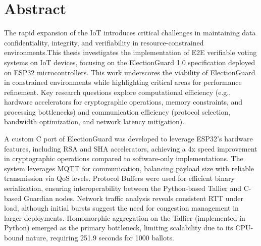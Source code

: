 \chapter*{Abstract}
The rapid expansion of the \ac{IoT} introduces critical challenges in maintaining data confidentiality, integrity, and verifiability in resource-constrained environments.This thesis investigates the implementation of \ac{E2E} verifiable voting systems on IoT devices, focusing on the ElectionGuard 1.0 specification deployed on ESP32 microcontrollers. This work underscores the viability of ElectionGuard in constrained environments while highlighting critical areas for performance refinement. Key research questions explore computational efficiency (e.g., hardware accelerators for cryptographic operations, memory constraints, and processing bottlenecks) and communication efficiency (protocol selection, bandwidth optimization, and network latency mitigation).

A custom C port of ElectionGuard was developed to leverage ESP32's hardware features, including \ac{RSA} and \ac{SHA} accelerators, achieving a 4x speed improvement in cryptographic operations compared to software-only implementations. The system leverages \ac{MQTT} for communication, balancing payload size with reliable transmission via QoS levels. Protocol Buffers were used for efficient binary serialization, ensuring interoperability between the Python-based Tallier and C-based Guardian nodes. Network traffic analysis reveals consistent \ac{RTT} under load, although initial bursts suggest the need for congestion management in larger deployments. Homomorphic aggregation on the Tallier (implemented in Python) emerged as the primary bottleneck, limiting scalability due to its CPU-bound nature, requiring 251.9 seconds for 1000 ballots. 

